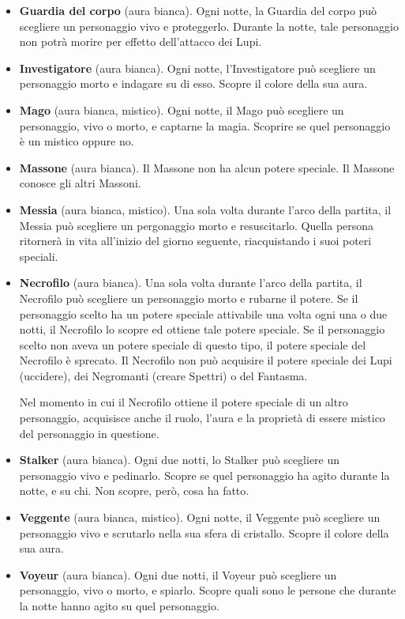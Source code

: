 \documentclass[a4paper,10pt]{article}
\begin{document}
\begin{itemize}
 \item {\bf Guardia del corpo} (aura bianca). Ogni notte, la Guardia del corpo può scegliere un personaggio vivo e proteggerlo. Durante la notte, tale personaggio non potrà morire per effetto dell'attacco dei Lupi.
 
 \item {\bf Investigatore} (aura bianca). Ogni notte, l'Investigatore può scegliere un personaggio morto e indagare su di esso. Scopre il colore della sua aura.

 \item {\bf Mago} (aura bianca, mistico). Ogni notte, il Mago può scegliere un personaggio, vivo o morto, e captarne la magia. Scoprire se quel personaggio è un mistico oppure no.
 
 \item {\bf Massone} (aura bianca). Il Massone non ha alcun potere speciale. Il Massone conosce gli altri Massoni.
 
 \item {\bf Messia} (aura bianca, mistico). Una sola volta durante l'arco della partita, il Messia può scegliere un pergonaggio morto e resuscitarlo. Quella persona ritornerà in vita all'inizio del giorno seguente, riacquistando i suoi poteri speciali.


 \item {\bf Necrofilo} (aura bianca). Una sola volta durante l'arco della partita, il Necrofilo può scegliere un personaggio morto e rubarne il potere. 
 Se il personaggio scelto ha un potere speciale attivabile una volta ogni una o due notti, il Necrofilo lo scopre ed ottiene tale potere speciale.
 Se il personaggio scelto non aveva un potere speciale di questo tipo, il potere speciale del Necrofilo è sprecato.
 Il Necrofilo non può acquisire il potere speciale dei Lupi (uccidere), dei Negromanti (creare Spettri) o del Fantasma.
 
 Nel momento in cui il Necrofilo ottiene il potere speciale di un altro personaggio, acquisisce anche il ruolo, l'aura e la proprietà di essere mistico del personaggio in questione.

 \item {\bf Stalker} (aura bianca). Ogni due notti, lo Stalker può scegliere un personaggio vivo e pedinarlo. Scopre se quel personaggio ha agito durante la notte, e su chi. Non scopre, però, cosa ha fatto.
 
 \item {\bf Veggente} (aura bianca, mistico). Ogni notte, il Veggente può scegliere un personaggio vivo e scrutarlo nella sua sfera di cristallo. Scopre il colore della sua aura.

 \item {\bf Voyeur} (aura bianca). Ogni due notti, il Voyeur può scegliere un personaggio, vivo o morto, e spiarlo. Scopre quali sono le persone che durante la notte hanno agito su quel personaggio.
 

\end{itemize}
\end{document}

